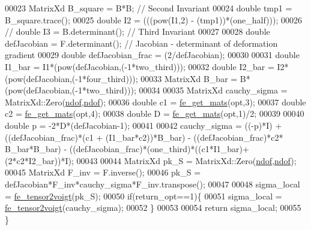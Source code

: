 \begin{DoxyCode}
00023         MatrixXd B\_square = B*B; \textcolor{comment}{// Second Invariant}
00024         \textcolor{keywordtype}{double} tmp1 = B\_square.trace();
00025         \textcolor{keywordtype}{double} I2 =  (((pow(I1,2) - (tmp1))*(one\_half)));
00026         \textcolor{comment}{// double I3 = B.determinant(); // Third Invariant}
00027 
00028         \textcolor{keywordtype}{double} defJacobian = F.determinant(); \textcolor{comment}{// Jacobian - determinant of deformation gradient}
00029         \textcolor{keywordtype}{double} defJacobian\_frac = (2/defJacobian);
00030 
00031         \textcolor{keywordtype}{double} I1\_bar = I1*(pow(defJacobian,(-1*two\_third)));
00032         \textcolor{keywordtype}{double} I2\_bar = I2*(pow(defJacobian,(-1*four\_third)));
00033         MatrixXd B\_bar = B*(pow(defJacobian,(-1*two\_third)));
00034 
00035         MatrixXd cauchy\_sigma = MatrixXd::Zero(\hyperlink{_global_variables_8h_aa789fe4d8a13fd0990b630909430d5d0}{ndof},\hyperlink{_global_variables_8h_aa789fe4d8a13fd0990b630909430d5d0}{ndof});
00036         \textcolor{keywordtype}{double} c1 = \hyperlink{functions_8h_af7ffbad6dfcc99fc88b130c1a7b1720a}{fe\_get\_mats}(opt,3);
00037         \textcolor{keywordtype}{double} c2 = \hyperlink{functions_8h_af7ffbad6dfcc99fc88b130c1a7b1720a}{fe\_get\_mats}(opt,4);
00038         \textcolor{keywordtype}{double} D = \hyperlink{functions_8h_af7ffbad6dfcc99fc88b130c1a7b1720a}{fe\_get\_mats}(opt,1)/2;
00039 
00040         \textcolor{keywordtype}{double} p = -2*D*(defJacobian-1);
00041 
00042         cauchy\_sigma = ((-p)*I) + ((defJacobian\_frac)*(c1 + (I1\_bar*c2))*B\_bar) - ((defJacobian\_frac)*c2*
      B\_bar*B\_bar) - ((defJacobian\_frac)*(one\_third)*((c1*I1\_bar)+(2*c2*I2\_bar))*I);
00043 
00044         MatrixXd pk\_S = MatrixXd::Zero(\hyperlink{_global_variables_8h_aa789fe4d8a13fd0990b630909430d5d0}{ndof},\hyperlink{_global_variables_8h_aa789fe4d8a13fd0990b630909430d5d0}{ndof});
00045         MatrixXd F\_inv = F.inverse();
00046         pk\_S = defJacobian*F\_inv*cauchy\_sigma*F\_inv.transpose();
00047 
00048         sigma\_local = \hyperlink{functions_8h_a73c4523ec7068af2af9e8431021f5fdf}{fe\_tensor2voigt}(pk\_S); 
00050         \textcolor{keywordflow}{if}(return\_opt==1)\{
00051             sigma\_local = \hyperlink{functions_8h_a73c4523ec7068af2af9e8431021f5fdf}{fe\_tensor2voigt}(cauchy\_sigma); 
00052         \}
00053 
00054     \textcolor{keywordflow}{return} sigma\_local;
00055 \}
\end{DoxyCode}
